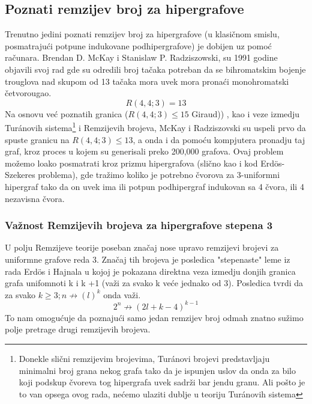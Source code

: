 \documentclass[a4paper]{article}
\begin{document}
	\subsection{Poznati remzijev broj za hipergrafove}%
	Trenutno jedini poznati remzijev broj za hipergrafove (u klasičnom smislu, posmatrajući potpune indukovane podhipergrafove)\cite{pregled}%
	 je dobijen uz pomoć računara. Brendan D. McKay i Stanislaw P. Radziszowski, su 1991 godine objavili svoj rad \textcite{HGremzibroj} gde su odredili broj tačaka potreban da se bihromatskim bojenje trouglova nad skupom od 13 tačaka mora uvek mora pronaći monohromatski četvorougao.%
	\begin{equation}
		R(4, 4; 3) = 13
	\end{equation}
	Na osnovu već poznatih granica ($R(4, 4; 3) \leq 15$ Giraud))%
	, kao i veze izmedju Tur\'{a}novih sistema\footnote{Donekle slični remzijevim brojevima, Tur\'{a}novi brojevi predstavljaju minimalni broj grana nekog grafa tako da je ispunjen uslov da onda za bilo koji podskup čvoreva tog hipergrafa uvek sadrži bar jendu granu. Ali pošto je to van opsega ovog rada, nećemo ulaziti dublje u teoriju Tur\'{a}novih sistema } i Remzijevih brojeva, McKay i Radziszovski su uspeli prvo da spuste granicu na $R(4, 4; 3) \leq 13$, a onda i da pomoću kompjutera pronadju taj graf, kroz proces u kojem su generisali preko 200,000 grafova. Ovaj problem možemo loako posmatrati kroz prizmu hipergrafova (slično kao i kod Erd\"{o}s-Szekeres problema), gde tražimo koliko je potrebno čvorova za 3-uniformni hipergraf tako da on uvek ima ili potpun podhipergraf indukovan sa 4 čvora, ili 4  nezavisna čvora. %
	\subsubsection{Važnost Remzijevih brojeva za hipergrafove stepena 3}
	U polju Remzijeve teorije poseban značaj nose upravo remzijevi brojevi za uniformne grafove reda 3. Značaj tih brojeva je posledica "stepenaste" leme iz rada Erd\"{o}s i Hajnala \cite{posledice3remzi} %
	 u kojoj je pokazana direktna veza izmedju donjih granica grafa unifomnoti k i k +1 (važi za svako k veće jednako od 3). Posledica tvrdi da za svako $k \geq 3; n \not\rightarrow (l)^k$ onda važi. \cite{matoraknjigajedvanadjena}
	\begin{equation}
		2^n \not\rightarrow (2l + k - 4)^{k-1}
	\end{equation}
	To nam omogućuje da poznajući samo jedan remzijev broj odmah znatno sužimo polje pretrage drugi remzijevih brojeva.
\end{document}

